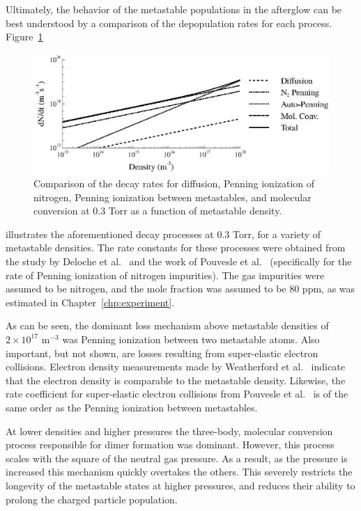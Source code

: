 Ultimately, the behavior of the metastable populations in the afterglow can be
best understood by a comparison of the depopulation rates for each process.
Figure~\ref{fig:decay}
\begin{figure}
  \centering
  \includegraphics{./chapters/metastables/figures/decay.eps}
  \caption{Comparison of the decay rates for diffusion, Penning ionization of
    nitrogen, Penning ionization between metastables, and molecular conversion at
    0.3 Torr as a function of metastable density.}
  \label{fig:decay}
\end{figure}
illustrates the aforementioned decay processes at 0.3 Torr, for a variety of
metastable densities. The rate constants for these processes were obtained from
the study by Deloche et al.~\cite{Deloche1976} and the work of Pouvesle et
al.~\cite{Pouvesle1988} (specifically for the rate of Penning ionization of
nitrogen impurities). The gas impurities were assumed to be nitrogen, and the
mole fraction was assumed to be 80 ppm, as was estimated in
Chapter~\ref{chp:experiment}.

As can be seen, the dominant loss mechanism above metastable densities of
$2\times10^{17}$ m$^{-3}$ was Penning ionization between two metastable atoms.
Also important, but not shown, are losses resulting from super-elastic electron
collisions. Electron density measurements made by Weatherford et
al.~\cite{Weatherford2012} indicate that the electron density is comparable to
the metastable density. Likewise, the rate coefficient for super-elastic
electron collisions from Pouvesle et al.~\cite{Pouvesle1988} is of the same
order as the Penning ionization between metastables.

At lower densities and higher pressures the three-body, molecular conversion
process responsible for dimer formation was dominant. However, this process
scales with the square of the neutral gas pressure. As a result, as the pressure
is increased this mechanism quickly overtakes the others. This severely
restricts the longevity of the metastable states at higher pressures, and
reduces their ability to prolong the charged particle population.

